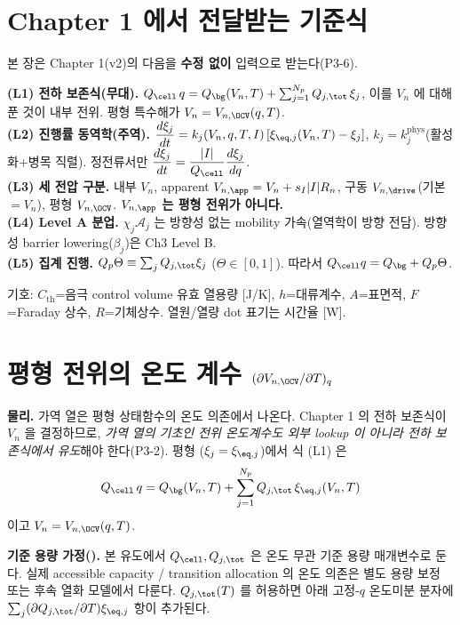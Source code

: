 \section{Chapter 1 에서 전달받는 기준식}\label{sec:ch2_inherit}
본 장은 Chapter 1(v2)의 다음을 \textbf{수정 없이} 입력으로 받는다(P3-6).
\begin{linkbox}
\textbf{(L1) 전하 보존식(무대).} $Q_\cell\,q=Q_\bg(V_n,T)+\sum_{j=1}^{N_p}Q_{j,\tot}\,\xi_j$, 이를 $V_n$ 에
대해 푼 것이 내부 전위. 평형 특수해가 $V_n=V_{n,\OCV}(q,T)$.\\
\textbf{(L2) 진행률 동역학(주역).} $\dfrac{d\xi_j}{dt}=k_j(V_n,q,T,I)\,[\xi_{\eq,j}(V_n,T)-\xi_j]$,
$k_j=k_j^{\mathrm{phys}}$(활성화+병목 직렬). 정전류서만 $\dfrac{d\xi_j}{dt}=\dfrac{|I|}{Q_\cell}\dfrac{d\xi_j}{dq}$.\\
\textbf{(L3) 세 전압 구분.} 내부 $V_n$, apparent $V_{n,\app}=V_n+s_I|I|R_n$, 구동 $V_{n,\drive}$(기본 $=V_n$),
평형 $V_{n,\OCV}$. \textbf{$V_{n,\app}$ 는 평형 전위가 아니다.}\\
\textbf{(L4) Level A 분업.} $\chi_j\mathcal A_j$ 는 방향성 없는 mobility 가속(열역학이 방향 전담). 방향성
barrier lowering($\beta_j$)은 Ch3 Level B.\\
\textbf{(L5) 집계 진행.} $Q_p\Theta\equiv\sum_jQ_{j,\tot}\xi_j$ ($\Theta\in[0,1]$). 따라서
$Q_\cell q=Q_\bg+Q_p\Theta$.
\end{linkbox}
기호: $C_{\mathrm{th}}$=음극 control volume 유효 열용량 [J/K], $h$=대류계수, $A$=표면적, $F$=Faraday
상수, $R$=기체상수. 열원/열량 dot 표기는 시간율 [W].

\section{평형 전위의 온도 계수 $(\partial V_{n,\OCV}/\partial T)_q$}\label{sec:ch2_ocvT}
\textbf{물리.} 가역 열은 평형 상태함수의 온도 의존에서 나온다. Chapter 1 의 전하 보존식이 $V_n$ 을 결정하므로,
\emph{가역 열의 기초인 전위 온도계수도 외부 lookup 이 아니라 전하 보존식에서 유도}해야 한다(P3-2). 평형
($\xi_j=\xi_{\eq,j}$)에서 식 (L1) 은
\begin{equation}
Q_\cell\,q=Q_\bg(V_n,T)+\sum_{j=1}^{N_p}Q_{j,\tot}\,\xi_{\eq,j}(V_n,T)
\label{eq:ch2_eqbal}
\end{equation}
이고 $V_n=V_{n,\OCV}(q,T)$.

\textbf{기준 용량 가정().} 본 유도에서 $Q_\cell,Q_{j,\tot}$ 은 온도 무관 기준 용량 매개변수로 둔다.
실제 accessible capacity / transition allocation 의 온도 의존은 별도 용량 보정 또는 후속 열화 모델에서
다룬다. $Q_{j,\tot}(T)$ 를 허용하면 아래 고정-$q$ 온도미분 분자에 $\sum_j(\partial Q_{j,\tot}/\partial T)\xi_{\eq,j}$
항이 추가된다.

